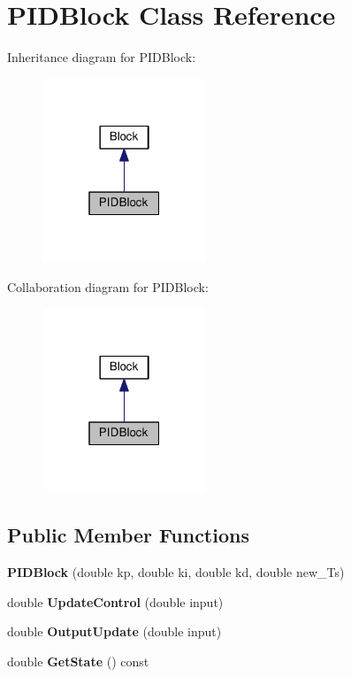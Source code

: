 \hypertarget{classPIDBlock}{}\section{P\+I\+D\+Block Class Reference}
\label{classPIDBlock}


Inheritance diagram for P\+I\+D\+Block\+:\nopagebreak
\begin{figure}[H]
\begin{center}
\leavevmode
\includegraphics[width=139pt]{classPIDBlock__inherit__graph}
\end{center}
\end{figure}


Collaboration diagram for P\+I\+D\+Block\+:\nopagebreak
\begin{figure}[H]
\begin{center}
\leavevmode
\includegraphics[width=139pt]{classPIDBlock__coll__graph}
\end{center}
\end{figure}
\subsection*{Public Member Functions}
\begin{DoxyCompactItemize}
\item 
\mbox{\label{classPIDBlock_a9ec4d61a225f114a32640d2007b35ca8}} 
{\bfseries P\+I\+D\+Block} (double kp, double ki, double kd, double new\+\_\+\+Ts)
\item 
\mbox{\label{classPIDBlock_a69d4c97d0b72eb2d650b5973b3a70073}} 
double {\bfseries Update\+Control} (double input)
\item 
\mbox{\label{classPIDBlock_aa17a548fbbd21bbc5252c0a07a196dc2}} 
double {\bfseries Output\+Update} (double input)
\item 
\mbox{\label{classPIDBlock_a88dc6380a6a8ddb92143f269f1af9adc}} 
double {\bfseries Get\+State} () const
\end{DoxyCompactItemize}
